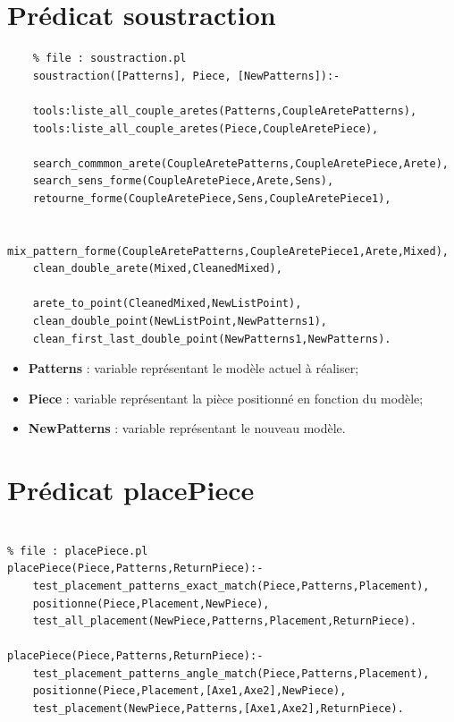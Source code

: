 \documentclass[a4paper, 11pt]{report}
\begin{document}
	
	
	
		
	\newpage	
		
	\tableofcontents

	\begin{appendices}

    \chapter{Prédicat soustraction}
    \begin{verbatim}
    % file : soustraction.pl
    soustraction([Patterns], Piece, [NewPatterns]):-

    tools:liste_all_couple_aretes(Patterns,CoupleAretePatterns),
    tools:liste_all_couple_aretes(Piece,CoupleAretePiece),

    search_commmon_arete(CoupleAretePatterns,CoupleAretePiece,Arete),
    search_sens_forme(CoupleAretePiece,Arete,Sens),
    retourne_forme(CoupleAretePiece,Sens,CoupleAretePiece1),

    mix_pattern_forme(CoupleAretePatterns,CoupleAretePiece1,Arete,Mixed),
    clean_double_arete(Mixed,CleanedMixed),

    arete_to_point(CleanedMixed,NewListPoint),
    clean_double_point(NewListPoint,NewPatterns1),
    clean_first_last_double_point(NewPatterns1,NewPatterns).
    \end{verbatim}

    \begin{itemize}
        \item \textbf{Patterns} : variable représentant le modèle actuel à réaliser;
        \item \textbf{Piece} : variable représentant la pièce positionné en fonction du modèle;
        \item \textbf{NewPatterns} : variable représentant le nouveau modèle.
    \end{itemize}

\chapter{Prédicat placePiece}
    \begin{verbatim}

% file : placePiece.pl
placePiece(Piece,Patterns,ReturnPiece):-
    test_placement_patterns_exact_match(Piece,Patterns,Placement),
    positionne(Piece,Placement,NewPiece),
    test_all_placement(NewPiece,Patterns,Placement,ReturnPiece).

placePiece(Piece,Patterns,ReturnPiece):-
    test_placement_patterns_angle_match(Piece,Patterns,Placement),
    positionne(Piece,Placement,[Axe1,Axe2],NewPiece),
    test_placement(NewPiece,Patterns,[Axe1,Axe2],ReturnPiece).


\end{verbatim}
\end{appendices}
\end{document}
